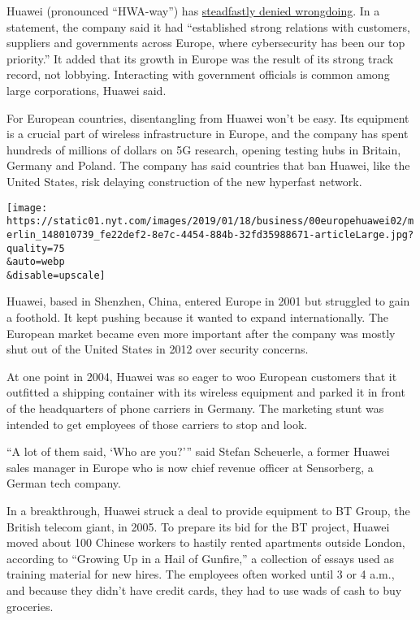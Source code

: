 Huawei (pronounced ``HWA-way'') has
\href{https://www.nytimes.com/2019/01/15/technology/huawei-ren-zhengfei.html}{steadfastly
denied wrongdoing}. In a statement, the company said it had
``established strong relations with customers, suppliers and governments
across Europe, where cybersecurity has been our top priority.'' It added
that its growth in Europe was the result of its strong track record, not
lobbying. Interacting with government officials is common among large
corporations, Huawei said.

For European countries, disentangling from Huawei won't be easy. Its
equipment is a crucial part of wireless infrastructure in Europe, and
the company has spent hundreds of millions of dollars on 5G research,
opening testing hubs in Britain, Germany and Poland. The company has
said countries that ban Huawei, like the United States, risk delaying
construction of the new hyperfast network.

\texttt{[image: https://static01.nyt.com/images/2019/01/18/business/00europehuawei02/merlin\_148010739\_fe22def2-8e7c-4454-884b-32fd35988671-articleLarge.jpg?quality=75\\\&auto=webp\\\&disable=upscale]}

Huawei, based in Shenzhen, China, entered Europe in 2001 but struggled
to gain a foothold. It kept pushing because it wanted to expand
internationally. The European market became even more important after
the company was mostly shut out of the United States in 2012 over
security concerns.

At one point in 2004, Huawei was so eager to woo European customers that
it outfitted a shipping container with its wireless equipment and parked
it in front of the headquarters of phone carriers in Germany. The
marketing stunt was intended to get employees of those carriers to stop
and look.

``A lot of them said, `Who are you?''' said Stefan Scheuerle, a former
Huawei sales manager in Europe who is now chief revenue officer at
Sensorberg, a German tech company.

In a breakthrough, Huawei struck a deal to provide equipment to BT
Group, the British telecom giant, in 2005. To prepare its bid for the BT
project, Huawei moved about 100 Chinese workers to hastily rented
apartments outside London, according to ``Growing Up in a Hail of
Gunfire,'' a collection of essays used as training material for new
hires. The employees often worked until 3 or 4 a.m., and because they
didn't have credit cards, they had to use wads of cash to buy groceries.

